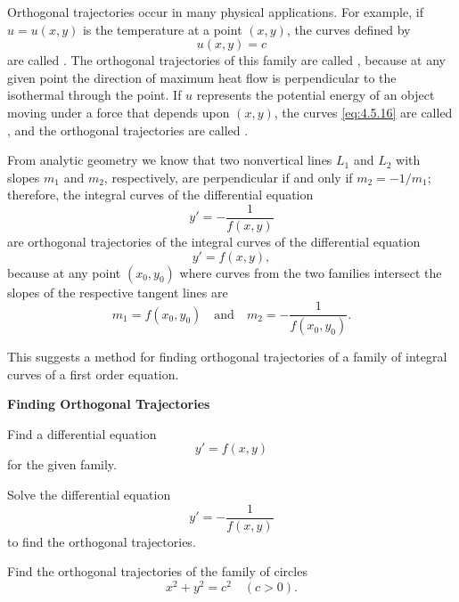 Orthogonal trajectories occur in many physical applications.
For example, if $u=u(x,y)$ is the temperature at a point $(x,y)$,  the
curves defined by
\begin{equation} \label{eq:4.5.16}
u(x,y)=c
\end{equation}
are called . The orthogonal trajectories of
this family are called , because at any given
point the direction of maximum heat flow is perpendicular to the
isothermal through the point. If $u$ represents the potential energy
of an object moving under a force that depends upon $(x,y)$,  the
curves \eqref{eq:4.5.16} are called , and the
orthogonal trajectories are called .

From analytic geometry we know that two nonvertical lines $L_1$ and
$L_2$ with slopes $m_1$ and $m_2$, respectively, are perpendicular if
and only if $m_2=-1/m_1$;  therefore, the integral curves of the
differential equation
\[
y'=-\frac{1}{f(x,y)}
\]
are orthogonal trajectories of the integral curves of the differential
equation
\[
y'=f(x,y),
\]
because at any point $(x_0,y_0)$ where curves from the two families
intersect the slopes of the respective tangent lines are
\[
m_1=f(x_0,y_0)\quad\text{and}\quad m_2=-\frac{1}{f(x_0,y_0)}.
\]

This suggests a  method for finding orthogonal trajectories
of a family of integral curves of a first order equation.

\begin{center}{\bfseries Finding Orthogonal Trajectories}\end{center}

\begin{enumext}[
  label=\arabic*,
  wrap-label={Step #1.},
  list-indent=0pt,
  labelwidth=4em]
\item Find a differential equation
\[
y'=f(x,y)
\]
 for the given family.

\item Solve the differential equation
\[
y'=-\frac{1}{f(x,y)}
\]
to find the orthogonal trajectories.
\end{enumext}

\begin{example}\label{example:4.5.9}
Find the orthogonal trajectories of the family of circles
\begin{equation} \label{eq:4.5.17}
x^2+y^2=c^2 \quad (c>0).
\end{equation}
\end{example}

